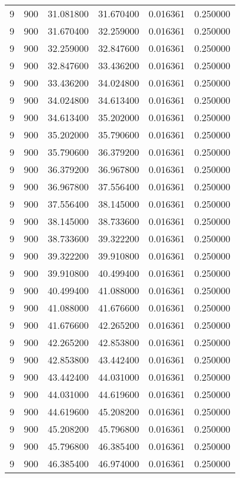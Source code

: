 \begin{longtable}{rrrrrr}
9 & 900 & 31.081800 & 31.670400 & 0.016361 & 0.250000 \\
9 & 900 & 31.670400 & 32.259000 & 0.016361 & 0.250000 \\
9 & 900 & 32.259000 & 32.847600 & 0.016361 & 0.250000 \\
9 & 900 & 32.847600 & 33.436200 & 0.016361 & 0.250000 \\
9 & 900 & 33.436200 & 34.024800 & 0.016361 & 0.250000 \\
9 & 900 & 34.024800 & 34.613400 & 0.016361 & 0.250000 \\
9 & 900 & 34.613400 & 35.202000 & 0.016361 & 0.250000 \\
9 & 900 & 35.202000 & 35.790600 & 0.016361 & 0.250000 \\
9 & 900 & 35.790600 & 36.379200 & 0.016361 & 0.250000 \\
9 & 900 & 36.379200 & 36.967800 & 0.016361 & 0.250000 \\
9 & 900 & 36.967800 & 37.556400 & 0.016361 & 0.250000 \\
9 & 900 & 37.556400 & 38.145000 & 0.016361 & 0.250000 \\
9 & 900 & 38.145000 & 38.733600 & 0.016361 & 0.250000 \\
9 & 900 & 38.733600 & 39.322200 & 0.016361 & 0.250000 \\
9 & 900 & 39.322200 & 39.910800 & 0.016361 & 0.250000 \\
9 & 900 & 39.910800 & 40.499400 & 0.016361 & 0.250000 \\
9 & 900 & 40.499400 & 41.088000 & 0.016361 & 0.250000 \\
9 & 900 & 41.088000 & 41.676600 & 0.016361 & 0.250000 \\
9 & 900 & 41.676600 & 42.265200 & 0.016361 & 0.250000 \\
9 & 900 & 42.265200 & 42.853800 & 0.016361 & 0.250000 \\
9 & 900 & 42.853800 & 43.442400 & 0.016361 & 0.250000 \\
9 & 900 & 43.442400 & 44.031000 & 0.016361 & 0.250000 \\
9 & 900 & 44.031000 & 44.619600 & 0.016361 & 0.250000 \\
9 & 900 & 44.619600 & 45.208200 & 0.016361 & 0.250000 \\
9 & 900 & 45.208200 & 45.796800 & 0.016361 & 0.250000 \\
9 & 900 & 45.796800 & 46.385400 & 0.016361 & 0.250000 \\
9 & 900 & 46.385400 & 46.974000 & 0.016361 & 0.250000 \\

\end{longtable}
